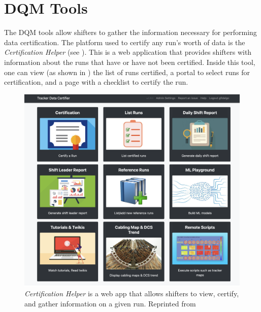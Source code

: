 \section{DQM Tools}
The DQM tools allow shifters to gather the information necessary for performing data certification. The platform used to certify any run's worth of data is the \textit{Certification Helper} (see ). This is a web application that provides shifters with information about the runs that have or have not been certified.
Inside this tool, one can view (as shown in ) the list of runs certified, a portal to select runs for certification, and a page with a checklist to certify the run.

\begin{figure}
	\centering
	\includegraphics[width=.75\linewidth]{Images/certhelper-menu.png}
	\caption[\textit{Certification Helper} webapp.]{\textit{Certification Helper} is a web app that allows shifters to view, certify, and gather information on a given run. Reprinted from \cite*{CertHelper}}
	\label{fig:certhelper}
\end{figure}

